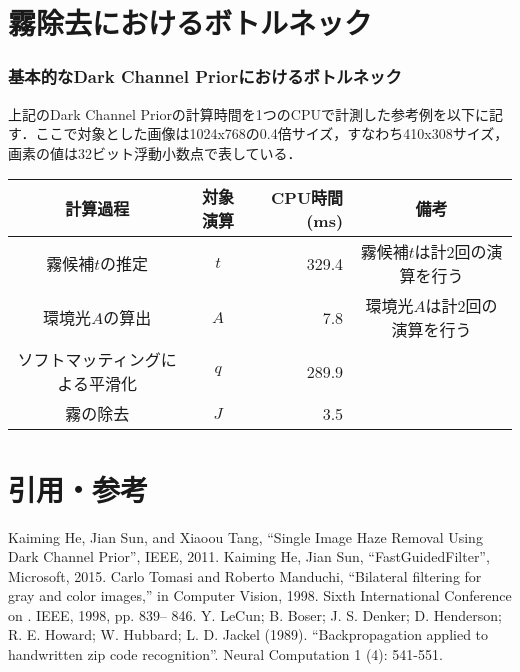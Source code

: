 \documentclass{jsarticle}
\begin{document}

\part{霧除去におけるボトルネック}
\label{霧除去におけるボトルネック}


\section{基本的なDark Channel Priorにおけるボトルネック}
\label{基本的なDark Channel Priorにおけるボトルネック}

上記のDark Channel Priorの計算時間を1つのCPUで計測した参考例を以下に記す．ここで対象とした画像は1024x768の0.4倍サイズ，すなわち410x308サイズ，画素の値は32ビット浮動小数点で表している．

\begin{table}[htb]
  \begin{center}
    \begin{tabular} {|c|c|r|c|} \hline
      計算過程 & 対象演算 & CPU時間(ms) & 備考 \\ \hline
      霧候補$t$の推定 & $t$ & 329.4 & 霧候補$t$は計2回の演算を行う \\
      環境光$A$の算出 & $A$ & 7.8 & 環境光$A$は計2回の演算を行う \\
      ソフトマッティングによる平滑化 & $q$ & 289.9 & \\
      霧の除去 & $J$ & 3.5 & \\ \hline
    \end{tabular}
  \end{center}
\end{table}


\part{引用・参考}
\label{引用・参考}

\begin{thebibliography}{9}
 Kaiming He, Jian Sun, and Xiaoou Tang, “Single Image Haze Removal Using Dark Channel Prior”, IEEE,  2011.
 Kaiming He, Jian Sun, “FastGuidedFilter”, Microsoft, 2015.
 Carlo Tomasi and Roberto Manduchi, “Bilateral filtering for gray and color images,” in Computer Vision, 1998. Sixth International Conference on . IEEE, 1998, pp. 839– 846.
 Y. LeCun; B. Boser; J. S. Denker; D. Henderson; R. E. Howard; W. Hubbard; L. D. Jackel (1989). “Backpropagation applied to handwritten zip code recognition”. Neural Computation 1 (4): 541-551.
\end{thebibliography}
\end{document}
